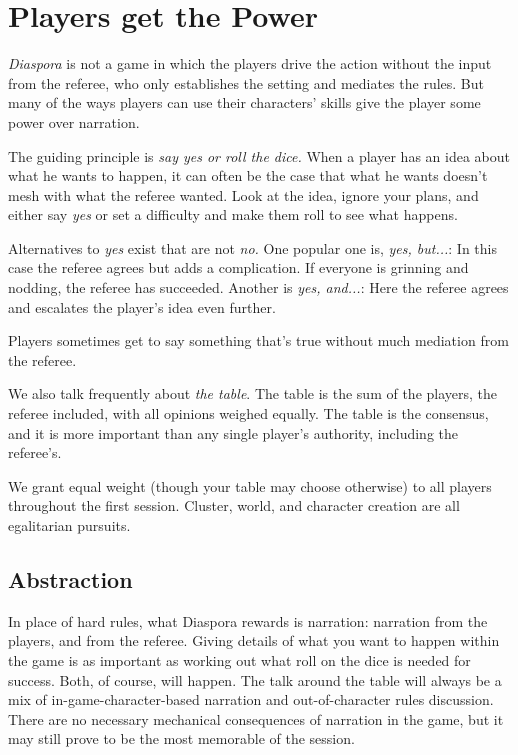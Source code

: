 \section{Players get the Power}\label{sec:players-get-the-power}
\vfil

\emph{Diaspora} is not a game in which the players drive the action without the input from the referee, who only establishes the setting and mediates the rules.  But many of the ways players can use their characters' skills give the player some power over narration.

The guiding principle is \emph{say yes or roll the dice.} When a player has an idea about what he wants to happen, it can often be the case that what he wants doesn't mesh with what the referee wanted. Look at the idea, ignore your plans, and either say \emph{yes} or set a difficulty and make them roll to see what happens.


Alternatives to \emph{yes} exist that are not \emph{no.} One popular one is, \emph{yes, but...}: In this case the referee agrees but adds a complication. If everyone is grinning and nodding, the referee has succeeded. Another is \emph{yes, and...}: Here the referee agrees and escalates the player's idea even further.

Players sometimes get to say something that's true without much mediation from the referee.

We also talk frequently about \emph{the table}. The table is the sum of the players, the referee included, with all opinions weighed equally. The table is the consensus, and it is more important than any single player's authority, including the referee's.


We grant equal weight (though your table may choose otherwise) to all players throughout the first session. Cluster, world, and character creation are all egalitarian pursuits.


\subsection{Abstraction}
\label{sec:abstraction}
\vfil

% 

In place of hard rules, what Diaspora rewards is narration: narration from the players, and from the referee. Giving details of what you want to happen within the game is as important as working out what roll on the dice is needed for success. Both, of course, will happen. The talk around the table will always be a mix of in-game-character-based narration and out-of-character rules discussion. There are no necessary mechanical consequences of narration in the game, but it may still prove to be the most memorable of the session.

